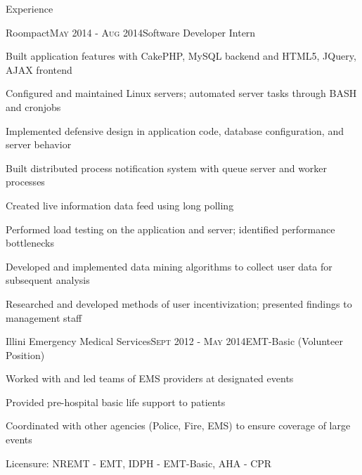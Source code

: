 \documentclass{resume} %
\begin{document}
\begin{rSection}{Experience}

\begin{rSubsection}{Roompact}{\textsc{May 2014 - Aug 2014}}{Software Developer Intern}{}
\item Built application features with CakePHP, MySQL backend and HTML5, JQuery, AJAX frontend
\item Configured and maintained Linux servers; automated server tasks through BASH and cronjobs
\item Implemented defensive design in application code, database configuration, and server behavior
\item Built distributed process notification system with queue server and worker processes
\item Created live information data feed using long polling
\item Performed load testing on the application and server; identified performance bottlenecks
\item Developed and implemented data mining algorithms to collect user data for subsequent analysis
\item Researched and developed methods of user incentivization; presented findings to management staff
\end{rSubsection}


\begin{rSubsection}{Illini Emergency Medical Services}{\textsc{Sept 2012 - May 2014}}{EMT-Basic (Volunteer Position)}{}
\item Worked with and led teams of EMS providers at designated events
\item Provided pre-hospital basic life support to patients
\item Coordinated with other agencies (Police, Fire, EMS) to ensure coverage of large events
\item Licensure: NREMT - EMT, IDPH - EMT-Basic, AHA - CPR
\end{rSubsection}



\end{rSection}
\end{document}
